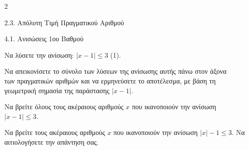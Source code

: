 \begin{ylh}{2}
    \item 2.3. Απόλυτη Τιμή Πραγματικού Αριθμού
    \item 4.1. Ανισώσεις 1ου Βαθμού
\end{ylh}

\begin{alist}
\item Να λύσετε την ανίσωση: $|x-1| \le 3$ (1).
\item Να απεικονίσετε το σύνολο των λύσεων της ανίσωσης αυτής πάνω στον άξονα\\
των πραγματικών αριθμών και να ερμηνεύσετε το αποτέλεσμα, με βάση τη\\
γεωμετρική σημασία της παράστασης $|x-1|$.
\item Να βρείτε όλους τους ακέραιους αριθμούς $x$ που ικανοποιούν την ανίσωση $|x-1| \le 3$.

\item Να βρείτε τους ακέραιους αριθμούς $x$ που ικανοποιούν την ανίσωση $|x|-1 \le 3$. Να αιτιολογήσετε την απάντηση σας.
\end{alist}

